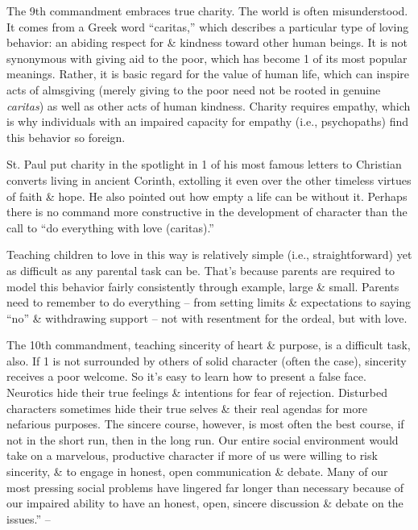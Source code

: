 \documentclass{article}
\numberwithin{equation}{section}
\begin{document}
The 9th commandment embraces true charity. The world is often misunderstood. It comes from a Greek word ``caritas,'' which describes a particular type of loving behavior: an abiding respect for \& kindness toward other human beings. It is not synonymous with giving aid to the poor, which has become 1 of its most popular meanings. Rather, it is basic regard for the value of human life, which can inspire acts of almsgiving (merely giving to the poor need not be rooted in genuine \textit{caritas}) as well as other acts of human kindness. Charity requires empathy, which is why individuals with an impaired capacity for empathy (i.e., psychopaths) find  this behavior so foreign.

St. Paul put charity in the spotlight in 1 of his most famous letters to Christian converts living in ancient Corinth, extolling it even over the other timeless virtues of faith \& hope. He also pointed out how empty a life can be without it. Perhaps there is no command more constructive in the development of character than the call to ``do everything with love (caritas).''

Teaching children to love in this way is relatively simple (i.e., straightforward) yet as difficult as any parental task can be. That's because parents are required to model this behavior fairly consistently through example, large \& small. Parents need to remember to do everything -- from setting limits \& expectations to saying ``no'' \& withdrawing support -- not with resentment for the ordeal, but with love.

The 10th commandment, teaching sincerity of heart \& purpose, is a difficult task, also. If 1 is not surrounded by others of solid character (often the case), sincerity receives a poor welcome. So it's easy to learn how to present a false face. Neurotics hide their true feelings \& intentions for fear of rejection. Disturbed characters sometimes hide their true selves \& their real agendas for more nefarious purposes. The sincere course, however, is most often the best course, if not in the short run, then in the long run. Our entire social environment would take on a marvelous, productive character if more of us were willing to risk sincerity, \& to engage in honest, open communication \& debate. Many of our most pressing social problems have lingered far longer than necessary because of our impaired ability to have an honest, open, sincere discussion \& debate on the issues.'' -- \cite[pp. 129--146]{Simon2011}

\end{document}
